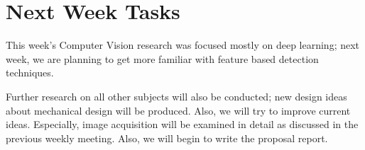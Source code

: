 \section{Next Week Tasks}
\label{sec:tasks}

This week's Computer Vision research was focused mostly on deep learning; next week, we are planning to get more familiar with feature based detection techniques.

Further research on all other subjects will also be conducted; new design ideas about mechanical design will be produced. Also, we will try to improve current ideas. Especially, image acquisition will be examined in detail as discussed in the previous weekly meeting. Also, we will begin to write the proposal report.
